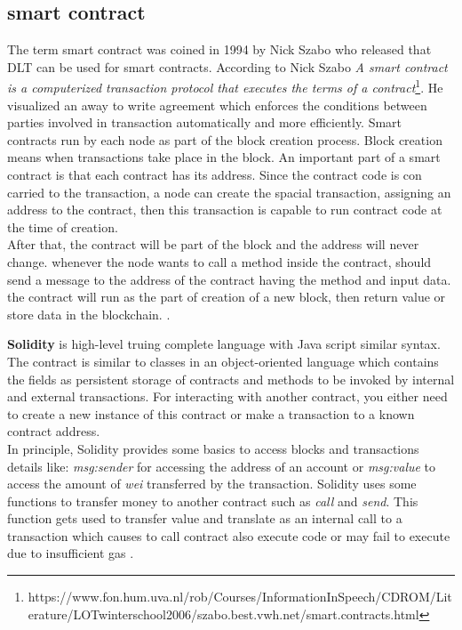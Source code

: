 \subsection{smart contract}
 The term smart contract was coined in 1994 by Nick Szabo who released that DLT can be used for smart contracts. 
According to Nick Szabo \textit{A smart contract is a computerized transaction protocol that executes the terms of a contract}\footnote{https://www.fon.hum.uva.nl/rob/Courses/InformationInSpeech/CDROM/Literature/LOTwinterschool2006/szabo.best.vwh.net/smart.contracts.html}. He visualized an away to write agreement which enforces the conditions between parties involved in transaction automatically and more efficiently.
Smart contracts run by each node as part of the block creation process. Block creation means when transactions take place in the block.
An important part of a smart contract is that each contract has its address. Since the contract code is con carried to the transaction, a node can create the spacial transaction, assigning an address to the contract, then this transaction is capable to run contract code at the time of creation.\\
After that, the contract will be part of the block and the address will never change. whenever the node wants to call a method inside the contract, should send a message to the address of the contract having the method and input data.
the contract will run as the part of creation of a new block, then return value or store data in the blockchain. \cite{Payrott}.

\textbf{Solidity} is high-level truing complete language with Java script similar syntax. The contract is similar to classes in an object-oriented language which contains the fields as persistent storage of contracts and methods to be invoked by internal and external transactions. For interacting with another contract, you either need to create a new instance of this contract or make a transaction to a known contract address.\\
In principle, Solidity provides some basics to access blocks and transactions details like: \textit{msg:sender} for accessing the address of an account or \textit{msg:value} to access the amount of \textit{wei} transferred by the transaction. Solidity uses some functions to transfer money to another contract such as \textit{call} and \textit{send}. This function gets used to transfer value and translate as an internal call to a transaction which causes to call contract also execute code or may fail to execute due to insufficient gas \cite{Ilya}.

